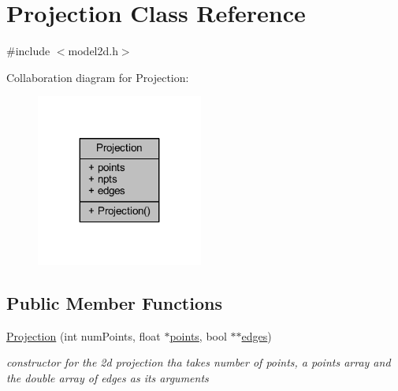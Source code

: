 \hypertarget{class_projection}{}\section{Projection Class Reference}
\label{class_projection}


{\ttfamily \#include $<$model2d.\+h$>$}



Collaboration diagram for Projection\+:\nopagebreak
\begin{figure}[H]
\begin{center}
\leavevmode
\includegraphics[width=155pt]{class_projection__coll__graph}
\end{center}
\end{figure}
\subsection*{Public Member Functions}
\begin{DoxyCompactItemize}
\item 
\mbox{\hyperlink{class_projection_a5308ac2fb97e9805c76e3cf767f08a0e}{Projection}} (int num\+Points, float $\ast$\mbox{\hyperlink{class_projection_aa42ba5494690dbfa5f875472adc97789}{points}}, bool $\ast$$\ast$\mbox{\hyperlink{class_projection_a7943c696e88d15825dee0641b269b5f7}{edges}})
\begin{DoxyCompactList}\small\item\em constructor for the 2d projection tha takes number of points, a points array and the double array of edges as its arguments \end{DoxyCompactList}\end{DoxyCompactItemize}
